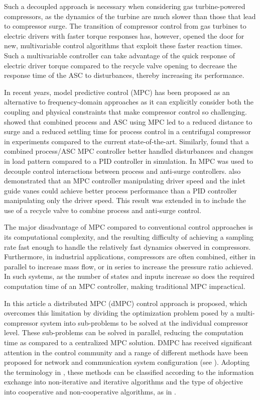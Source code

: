 Such a decoupled approach is necessary when considering gas turbine-powered compressors, as the dynamics of the turbine are much slower than those that lead to compressor surge.
The transition of compressor control from gas turbines to electric drivers with faster torque responses has, however, opened the door for new, multivariable control algorithms that exploit these faster reaction times.
Such a multivariable controller can take advantage of the quick response of electric driver torque compared to the recycle valve opening to decrease the response time of the ASC to disturbances, thereby increasing its performance.

In recent years, model predictive control (MPC) has been proposed as an alternative to frequency-domain approaches as it can explicitly consider both the coupling and physical constraints that make compressor control so challenging.
\cite{Cortinovis2015} showed that combined process and ASC using MPC led to a reduced distance to surge and a reduced settling time for process control in a centrifugal compressor in experiments compared to the current state-of-the-art.
Similarly, \cite{Budinis2015} found that a combined process/ASC MPC controller better handled disturbances and changes in load pattern compared to a PID controller in simulation.
In \cite{Mercangoz2016} MPC was used to decouple control interactions between process and anti-surge controllers.
\cite{Bentaleb2014} also demonstrated that an MPC controller manipulating driver speed and the inlet guide vanes could achieve better process performance than a PID controller manipulating only the driver speed.
This result was extended in \cite{Bentaleb2015} to include the use of a recycle valve to combine process and anti-surge control.

The major disadvantage of MPC compared to conventional control approaches is its computational complexity, and the resulting difficulty of achieving a sampling rate fast enough to handle the relatively fast dynamics observed in compressors.
Furthermore, in industrial applications, compressors are often combined, either in parallel to increase mass flow, or in series to increase the pressure ratio achieved.
In such systems, as the number of states and inputs increase so does the required computation time of an MPC controller, making traditional MPC impractical.

In this article a distributed MPC (dMPC) control approach is proposed, which overcomes this limitation by dividing the optimization problem posed by a multi-compressor system into sub-problems to be solved at the individual compressor level.
These sub-problems can be solved in parallel, reducing the computation time as compared to a centralized MPC solution.
DMPC has received significant attention in the control community and a range of different methods have been proposed for network and communication system configuration (see \cite{Camponogara2002, Venkat2007}).
Adopting the terminology in \cite{Scattolini2009}, these methods can be classified according to the information exchange into non-iterative and iterative algorithms and the type of objective into cooperative and non-cooperative algorithms, as in \cite{Zeilinger2013}.

